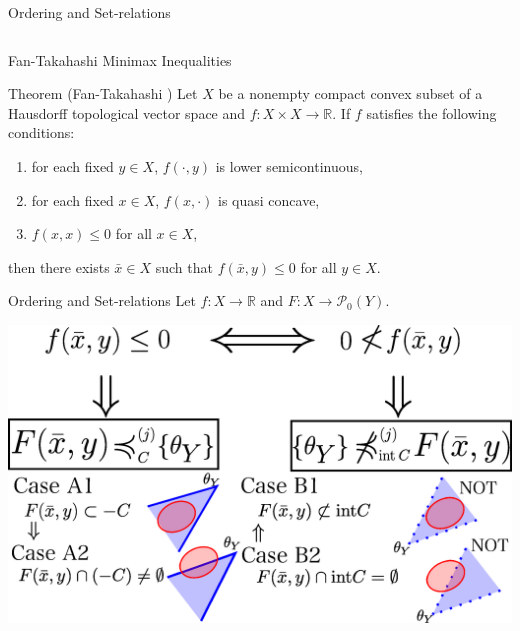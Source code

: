 \documentclass[aspectratio=169, dvipdfmx, 11pt]{beamer}
\newcommand{\RealNumberSet}{\mathbb{R}}
\newcommand{\pow}[1]{\mathcal{P}_{0}(#1)}
\begin{document}
\begin{frame}{Ordering and Set-relations}
\begin{columns}
\begin{column}{0.48\textwidth}
    \end{column}
  \end{columns}
\end{frame}

\begin{frame}{Fan-Takahashi Minimax Inequalities}
  \begin{block}{Theorem (Fan-Takahashi \cite{MR399979})} %
    Let $X$ be a nonempty compact convex subset of a Hausdorff topological vector space and $f \colon X \times X \to \RealNumberSet$. If $f$ satisfies
    the following conditions:
    \begin{enumerate}
      \item for each fixed $y \in X$, $f(\cdot,y)$ is lower semicontinuous,
      \item for each fixed $x \in X$, $f(x,\cdot)$ is quasi concave,
      \item $f(x,x) \leq 0$ for all $x \in X$,
    \end{enumerate}
    then there exists $\bar{x} \in X$ such that $f(\bar{x},y) \leq 0$ for all $y \in X$.
  \end{block}
\end{frame}

\begin{frame}{Ordering and Set-relations}
  Let $f:X \to \RealNumberSet$ and $F:X \to \pow{Y}$.

  \centering
  \includegraphics[keepaspectratio, scale=0.35]{figures/eps/4types_set_relations.eps}
\end{frame}
\end{document}

